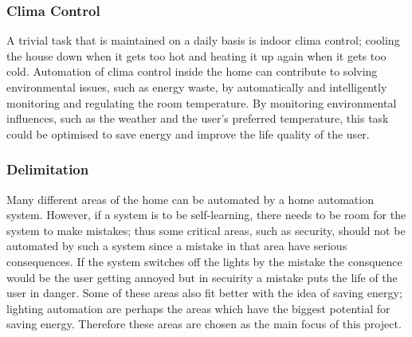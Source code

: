 
\subsubsection{Clima Control}
\label{sub:Room Temperature Regulation}
A trivial task that is maintained on a daily basis is indoor clima control;
cooling the house down when it gets too hot and heating it up again when it gets too cold.
Automation of clima control inside the home can contribute to solving environmental issues, such as energy waste,
by automatically and intelligently monitoring and regulating the room temperature.
By monitoring environmental influences, such as the weather and the user's preferred temperature,
this task could be optimised to save energy and improve the life quality of the user.

\subsubsection{Delimitation}
Many different areas of the home can be automated by a home automation system.
However, if a system is to be self-learning, there needs to be room for the system to make mistakes;
thus some critical areas, such as security, should not be automated by such a system since a mistake in that area have serious consequences.
If the system switches off the lights by the mistake the consquence would be the user getting annoyed but in secuirity a mistake puts the life of the user in danger.
Some of these areas also fit better with the idea of saving energy;
lighting automation are perhaps the areas which have the biggest potential for saving energy.
Therefore these areas are chosen as the main focus of this project.
